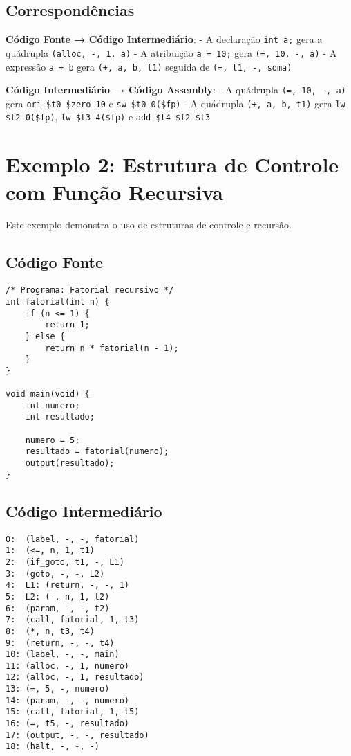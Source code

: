 \documentclass[
	12pt,				%
	oneside,
	a4paper,			%
	english,			%
	french,				%
	spanish,			%
	brazil,				%
	]{abntex2}
\begin{document}
\subsection{Correspondências}

\textbf{Código Fonte → Código Intermediário}:
- A declaração \texttt{int a;} gera a quádrupla \texttt{(alloc, -, 1, a)}
- A atribuição \texttt{a = 10;} gera \texttt{(=, 10, -, a)}
- A expressão \texttt{a + b} gera \texttt{(+, a, b, t1)} seguida de \texttt{(=, t1, -, soma)}

\textbf{Código Intermediário → Código Assembly}:
- A quádrupla \texttt{(=, 10, -, a)} gera \texttt{ori \$t0 \$zero 10} e \texttt{sw \$t0 0(\$fp)}
- A quádrupla \texttt{(+, a, b, t1)} gera \texttt{lw \$t2 0(\$fp)}, \texttt{lw \$t3 4(\$fp)} e \texttt{add \$t4 \$t2 \$t3}

\section{Exemplo 2: Estrutura de Controle com Função Recursiva}

Este exemplo demonstra o uso de estruturas de controle e recursão.

\subsection{Código Fonte}

\begin{lstlisting}[style=cstyle, caption=Exemplo 2: Código fonte C-]
/* Programa: Fatorial recursivo */
int fatorial(int n) {
    if (n <= 1) {
        return 1;
    } else {
        return n * fatorial(n - 1);
    }
}

void main(void) {
    int numero;
    int resultado;
    
    numero = 5;
    resultado = fatorial(numero);
    output(resultado);
}
\end{lstlisting}

\subsection{Código Intermediário}

\begin{lstlisting}[style=cstyle, caption=Exemplo 2: Código intermediário (quádruplas)]
0:  (label, -, -, fatorial)
1:  (<=, n, 1, t1)
2:  (if_goto, t1, -, L1)
3:  (goto, -, -, L2)
4:  L1: (return, -, -, 1)
5:  L2: (-, n, 1, t2)
6:  (param, -, -, t2)
7:  (call, fatorial, 1, t3)
8:  (*, n, t3, t4)
9:  (return, -, -, t4)
10: (label, -, -, main)
11: (alloc, -, 1, numero)
12: (alloc, -, 1, resultado)
13: (=, 5, -, numero)
14: (param, -, -, numero)
15: (call, fatorial, 1, t5)
16: (=, t5, -, resultado)
17: (output, -, -, resultado)
18: (halt, -, -, -)
\end{lstlisting}
\end{document}
